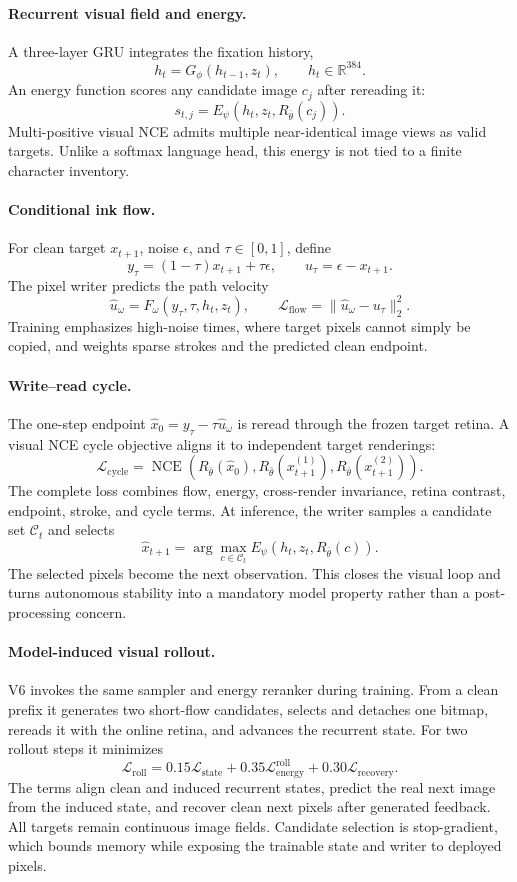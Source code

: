 \documentclass[11pt]{article}
\begin{document}
\paragraph{Recurrent visual field and energy.}
A three-layer GRU integrates the fixation history,
\[
h_t=G_\phi(h_{t-1},z_t),\qquad h_t\in\mathbb{R}^{384}.
\]
An energy function scores any candidate image $c_j$ after rereading it:
\[
s_{t,j}=E_\psi(h_t,z_t,R_{\bar\theta}(c_j)).
\]
Multi-positive visual NCE admits multiple near-identical image views as valid
targets. Unlike a softmax language head, this energy is not tied to a finite
character inventory.

\paragraph{Conditional ink flow.}
For clean target $x_{t+1}$, noise $\epsilon$, and $\tau\in[0,1]$, define
\[
y_\tau=(1-\tau)x_{t+1}+\tau\epsilon,
\qquad u_\tau=\epsilon-x_{t+1}.
\]
The pixel writer predicts the path velocity
\[
\hat u_\omega=F_\omega(y_\tau,\tau,h_t,z_t),\qquad
\mathcal L_{\mathrm{flow}}=
\lVert\hat u_\omega-u_\tau\rVert_2^2.
\]
Training emphasizes high-noise times, where target pixels cannot simply be
copied, and weights sparse strokes and the predicted clean endpoint.

\paragraph{Write--read cycle.}
The one-step endpoint $\hat x_0=y_\tau-\tau\hat u_\omega$ is reread through the
frozen target retina. A visual NCE cycle objective aligns it to independent
target renderings:
\[
\mathcal L_{\mathrm{cycle}}=
\operatorname{NCE}\!\left(R_{\bar\theta}(\hat x_0),
R_{\bar\theta}(x_{t+1}^{(1)}),R_{\bar\theta}(x_{t+1}^{(2)})\right).
\]
The complete loss combines flow, energy, cross-render invariance, retina
contrast, endpoint, stroke, and cycle terms. At inference, the writer samples a
candidate set $\mathcal C_t$ and selects
\[
\hat x_{t+1}=\arg\max_{c\in\mathcal C_t}
E_\psi(h_t,z_t,R_{\bar\theta}(c)).
\]
The selected pixels become the next observation. This closes the visual loop and
turns autonomous stability into a mandatory model property rather than a
post-processing concern.

\paragraph{Model-induced visual rollout.}
V6 invokes the same sampler and energy reranker during training. From a clean
prefix it generates two short-flow candidates, selects and detaches one bitmap,
rereads it with the online retina, and advances the recurrent state. For two
rollout steps it minimizes
\[
\mathcal L_{\mathrm{roll}}=
0.15\mathcal L_{\mathrm{state}}+
0.35\mathcal L_{\mathrm{energy}}^{\mathrm{roll}}+
0.30\mathcal L_{\mathrm{recovery}}.
\]
The terms align clean and induced recurrent states, predict the real next image
from the induced state, and recover clean next pixels after generated feedback.
All targets remain continuous image fields. Candidate selection is
stop-gradient, which bounds memory while exposing the trainable state and writer
to deployed pixels.
\end{document}
